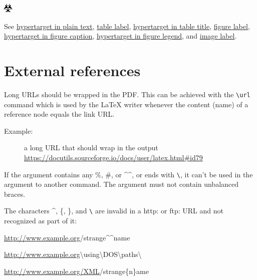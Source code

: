\documentclass[a4paper]{article}
\newenvironment{DUlineblock}[1]{%
    \list{}{\setlength{\partopsep}{\parskip}
            \addtolength{\partopsep}{\baselineskip}
            \setlength{\topsep}{0pt}
            \setlength{\itemsep}{0.15\baselineskip}
            \setlength{\parsep}{0pt}
            \setlength{\leftmargin}{#1}}
    \raggedright
  }
  {\endlist}
\begin{document}
\includegraphics{../../../docs/user/rst/images/biohazard.png}
\label{image-label}

See \hyperref[hypertarget-in-plain-text]{hypertarget in plain text},
\hyperref[table-label]{table label}, \hyperref[hypertarget-in-table-title]{hypertarget in table title},
\hyperref[figure-label]{figure label}, \hyperref[hypertarget-in-figure-caption]{hypertarget in figure caption},
\hyperref[hypertarget-in-figure-legend]{hypertarget in figure legend}, and
\hyperref[image-label]{image label}.


\section{External references%
  \label{external-references}%
}

Long URLs should be wrapped in the PDF. This can be achieved with the
\texttt{\textbackslash{}url} command which is used by the LaTeX writer whenever the content
(name) of a reference node equals the link URL.

\begin{description}
\item[{Example:}] 
a long URL that should wrap in the output
\url{https://docutils.sourceforge.io/docs/user/latex.html\#id79}

\end{description}

If the argument contains any \textquotedbl{}\%\textquotedbl{}, \textquotedbl{}\#\textquotedbl{}, or \textquotedbl{}\textasciicircum{}\textasciicircum{}\textquotedbl{}, or ends with \texttt{\textbackslash{}}, it can't
be used in the argument to another command. The argument must not contain
unbalanced braces.

The characters \textasciicircum{}, \{, \}, and \texttt{\textbackslash{}} are invalid in a \textquotedbl{}http:\textquotedbl{} or \textquotedbl{}ftp:\textquotedbl{} URL
and not recognized as part of it:

\begin{DUlineblock}{0em}
\item[] \url{http://www.example.org}/strange\textasciicircum{}\textasciicircum{}name
\item[] \url{http://www.example.org}\textbackslash{}using\textbackslash{}DOS\textbackslash{}paths\textbackslash{}
\item[] \url{http://www.example.org/XML}/strange\{n\}ame
\end{DUlineblock}
\end{document}
